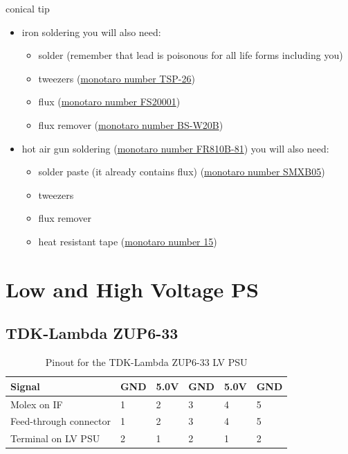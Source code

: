 conical tip
\begin{itemize}
\item iron soldering you will also need:
  \begin{itemize}
  \item solder (remember that lead is poisonous for all life forms including
    you)
  \item tweezers
    (\href{https://www.monotaro.com/p/0840/4873/?displayId=5}{monotaro number
      TSP-26})
  \item flux (\href{https://www.monotaro.com/p/3952/8833/?displayId=5}{monotaro
      number FS20001})
  \item flux remover
    (\href{https://www.monotaro.com/p/6215/1382/?displayId=5}{monotaro number
      BS-W20B})
  \end{itemize}
\item hot air gun soldering
  (\href{https://www.monotaro.com/p/4893/0954/?displayId=5}{monotaro number
    FR810B-81}) you will also need:
  \begin{itemize}
  \item solder paste (it already contains flux)
    (\href{https://www.monotaro.com/p/1001/3097/?displayId=5}{monotaro number
      SMXB05})
  \item tweezers
  \item flux remover
  \item heat resistant tape
    (\href{https://www.monotaro.com/p/5638/8526/?displayId=5}{monotaro number
      15})
  \end{itemize}
\end{itemize}

\section{Low and High Voltage PS}
\subsection{TDK-Lambda ZUP6-33}
\begin{table}[H]
  \centering
  \begin{tabular}{|l|l l l l l|}
    \hline
    \textbf{Signal} & \textbf{GND} & \textbf{5.0V}
    & \textbf{GND} & \textbf{5.0V} & \textbf{GND} \\
    \hline
    Molex on IF & 1 & 2 & 3 & 4 & 5 \\
    Feed-through connector & 1 & 2 & 3 & 4 & 5 \\
    Terminal on LV PSU & 2 & 1 & 2 & 1 & 2 \\
    \hline
  \end{tabular}
  \caption{Pinout for the TDK-Lambda ZUP6-33 LV PSU}
\end{table}


